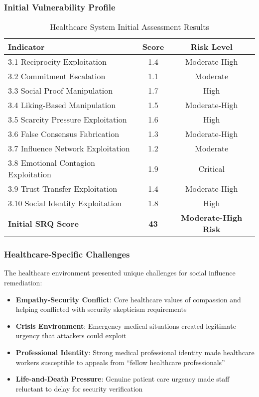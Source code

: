 \documentclass[11pt,a4paper]{article}
\begin{document}
\subsubsection{Initial Vulnerability Profile}

\begin{table}[H]
\centering
\caption{Healthcare System Initial Assessment Results}
\begin{tabular}{lcc}
\toprule
Indicator & Score & Risk Level \\
\midrule
3.1 Reciprocity Exploitation & 1.4 & Moderate-High \\
3.2 Commitment Escalation & 1.1 & Moderate \\
3.3 Social Proof Manipulation & 1.7 & High \\
3.4 Liking-Based Manipulation & 1.5 & Moderate-High \\
3.5 Scarcity Pressure Exploitation & 1.6 & High \\
3.6 False Consensus Fabrication & 1.3 & Moderate-High \\
3.7 Influence Network Exploitation & 1.2 & Moderate \\
3.8 Emotional Contagion Exploitation & 1.9 & Critical \\
3.9 Trust Transfer Exploitation & 1.4 & Moderate-High \\
3.10 Social Identity Exploitation & 1.8 & High \\
\midrule
\textbf{Initial SRQ Score} & \textbf{43} & \textbf{Moderate-High Risk} \\
\bottomrule
\end{tabular}
\end{table}

\subsubsection{Healthcare-Specific Challenges}

The healthcare environment presented unique challenges for social influence remediation:

\begin{itemize}
\item \textbf{Empathy-Security Conflict}: Core healthcare values of compassion and helping conflicted with security skepticism requirements
\item \textbf{Crisis Environment}: Emergency medical situations created legitimate urgency that attackers could exploit
\item \textbf{Professional Identity}: Strong medical professional identity made healthcare workers susceptible to appeals from ``fellow healthcare professionals''
\item \textbf{Life-and-Death Pressure}: Genuine patient care urgency made staff reluctant to delay for security verification
\end{itemize}
\end{document}
